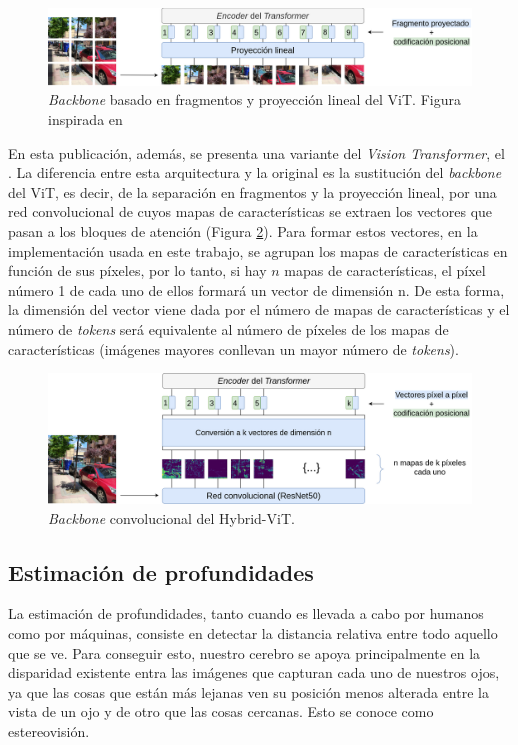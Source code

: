 \begin{figure}[H]
\centering
\includegraphics[width=1\linewidth]{imagenes/vit.png} 
\captionsetup{width=.8\linewidth}
\caption{\textit{Backbone} basado en fragmentos y proyección lineal del ViT. Figura inspirada en \cite{image16x16words}}
\label{fig:vit}
\end{figure}

En esta publicación, además, se presenta una variante del \textit{Vision Transformer}, el . La diferencia entre esta arquitectura y la original es la sustitución del \textit{backbone} del ViT, es decir, de la separación en fragmentos y la proyección lineal, por una red convolucional de cuyos mapas de características se extraen los vectores que pasan a los bloques de atención (Figura \ref{fig:hybrid-vit}). Para formar estos vectores, en la implementación usada en este trabajo, se agrupan los mapas de características en función de sus píxeles, por lo tanto, si hay $n$ mapas de características, el píxel número 1 de cada uno de ellos formará un vector de dimensión n. De esta forma, la dimensión del vector viene dada por el número de mapas de características y el número de \textit{tokens} será equivalente al número de píxeles de los mapas de características (imágenes mayores conllevan un mayor número de \textit{tokens}).

\begin{figure}[H]
\centering
\includegraphics[width=1\linewidth]{imagenes/vit-hybrid.png} 
\captionsetup{width=.8\linewidth}
\caption{\textit{Backbone} convolucional del Hybrid-ViT.}
\label{fig:hybrid-vit}
\end{figure}

\subsection{Estimación de profundidades}
La estimación de profundidades, tanto cuando es llevada a cabo por humanos como por máquinas, consiste en detectar la distancia relativa entre todo aquello que se ve. Para conseguir esto, nuestro cerebro se apoya principalmente en la disparidad existente entra las imágenes que capturan cada uno de nuestros ojos, ya que las cosas que están más lejanas ven su posición menos alterada entre la vista de un ojo y de otro que las cosas cercanas. Esto se conoce como estereovisión.


